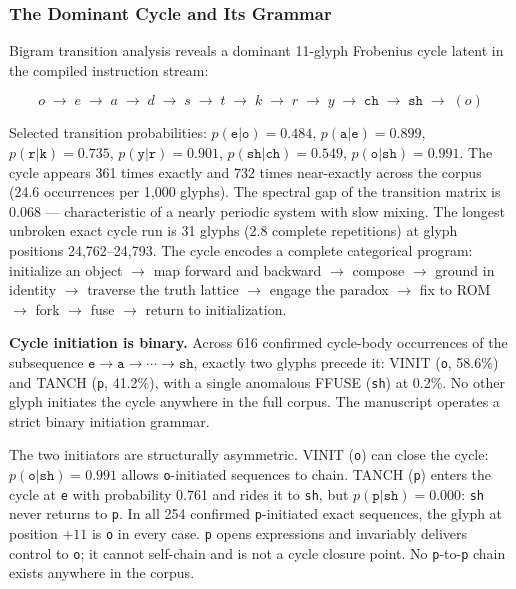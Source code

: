 \documentclass[12pt,a4paper]{article}
\begin{document}
\subsubsection{The Dominant Cycle and Its Grammar}

Bigram transition analysis reveals a dominant 11-glyph Frobenius cycle latent in the compiled instruction stream:

\[ o \;\to\; e \;\to\; a \;\to\; d \;\to\; s \;\to\; t \;\to\; k \;\to\; r \;\to\; y \;\to\; \texttt{ch} \;\to\; \texttt{sh} \;\to\; (o) \]

Selected transition probabilities: $p(\texttt{e}|\texttt{o}) = 0.484$, $p(\texttt{a}|\texttt{e}) = 0.899$, $p(\texttt{r}|\texttt{k}) = 0.735$, $p(\texttt{y}|\texttt{r}) = 0.901$, $p(\texttt{sh}|\texttt{ch}) = 0.549$, $p(\texttt{o}|\texttt{sh}) = 0.991$. The cycle appears 361 times exactly and 732 times near-exactly across the corpus (24.6 occurrences per 1,000 glyphs). The spectral gap of the transition matrix is 0.068 --- characteristic of a nearly periodic system with slow mixing. The longest unbroken exact cycle run is 31 glyphs (2.8 complete repetitions) at glyph positions 24,762--24,793. The cycle encodes a complete categorical program: initialize an object $\to$ map forward and backward $\to$ compose $\to$ ground in identity $\to$ traverse the truth lattice $\to$ engage the paradox $\to$ fix to ROM $\to$ fork $\to$ fuse $\to$ return to initialization.

\textbf{Cycle initiation is binary.} Across 616 confirmed cycle-body occurrences of the subsequence $\texttt{e} \to \texttt{a} \to \cdots \to \texttt{sh}$, exactly two glyphs precede it: VINIT (\texttt{o}, 58.6\%) and TANCH (\texttt{p}, 41.2\%), with a single anomalous FFUSE (\texttt{sh}) at 0.2\%. No other glyph initiates the cycle anywhere in the full corpus. The manuscript operates a strict binary initiation grammar.

The two initiators are structurally asymmetric. VINIT (\texttt{o}) can close the cycle: $p(\texttt{o}|\texttt{sh}) = 0.991$ allows \texttt{o}-initiated sequences to chain. TANCH (\texttt{p}) enters the cycle at \texttt{e} with probability 0.761 and rides it to \texttt{sh}, but $p(\texttt{p}|\texttt{sh}) = 0.000$: \texttt{sh} never returns to \texttt{p}. In all 254 confirmed \texttt{p}-initiated exact sequences, the glyph at position $+11$ is \texttt{o} in every case. \texttt{p} opens expressions and invariably delivers control to \texttt{o}; it cannot self-chain and is not a cycle closure point. No \texttt{p}-to-\texttt{p} chain exists anywhere in the corpus.
\end{document}
